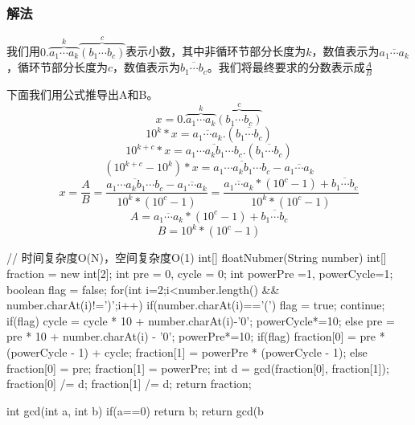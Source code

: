 \subsubsection{解法}

我们用$0.\overbrace{a_1 \cdots a_k}^{k} \overbrace{(b_1 \cdots b_c)}^{c}$表示小数，其中非循环节部分长度为$k$，数值表示为$\overline{a_1 \cdots a_k}$，循环节部分长度为$c$，数值表示为$\overline{b_1 \cdots b_c}$。我们将最终要求的分数表示成$\frac{A}{B}$

下面我们用公式推导出A和B。
\[ x = 0.\overbrace{a_1 \cdots a_k}^{k} \overbrace{(b_1 \cdots b_c)}^{c}  \]
\[ 10^k*x = \overline{a_1 \cdots a_k}.(\overline{b_1 \cdots b_c}) \]
\[ 10^{k+c}*x = \overline{a_1 \cdots a_kb_1 \cdots b_c}.(\overline{b_1 \cdots b_c}) \]
\[ (10^{k+c}-10^{k}) * x = \overline{a_1 \cdots a_kb_1 \cdots b_c}-\overline{a_1 \cdots a_k} \]
\[ x = \frac{A}{B} = \frac{\overline{a_1 \cdots a_kb_1 \cdots b_c}-\overline{a_1 \cdots a_k}}{10^k*(10^c-1)} = \frac{\overline{a_1 \cdots a_k}*(10^c-1) + \overline{b_1 \cdots b_c}}{10^k*(10^c-1)} \]
\[ A = \overline{a_1 \cdots a_k}*(10^c-1) + \overline{b_1 \cdots b_c} \]
\[ B = 10^k*(10^c-1) \]
\begin{Code}
// 时间复杂度O(N)，空间复杂度O(1)
int[] floatNubmer(String number) {
    int[] fraction = new int[2];
    int pre = 0, cycle = 0;
    int powerPre =1, powerCycle=1;
    boolean flag = false;
    for(int i=2;i<number.length() && number.charAt(i)!=')';i++) {
        if(number.charAt(i)=='(') {
            flag = true;
            continue;
        }
        if(flag) {
            cycle = cycle * 10 + number.charAt(i)-'0';
            powerCycle*=10;
         } else {
            pre = pre * 10 + number.charAt(i) - '0';
            powerPre*=10;
        }
    }
    if(flag) {
        fraction[0] = pre * (powerCycle - 1) + cycle;
        fraction[1] = powerPre * (powerCycle - 1);
    } else {
        fraction[0] = pre;
        fraction[1] = powerPre;
    }
    int d = gcd(fraction[0], fraction[1]);
    fraction[0] /= d;
    fraction[1] /= d;
    return fraction;
}

int gcd(int a, int b) {
    if(a==0) return b;
    return gcd(b%
}
\end{Code}

